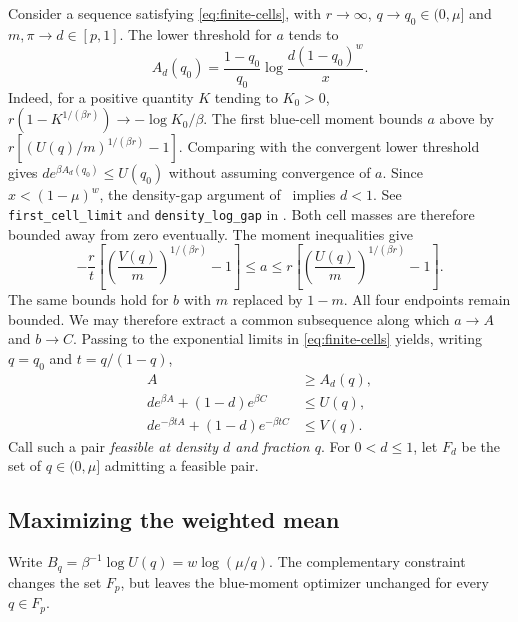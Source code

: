Consider a sequence satisfying \eqref{eq:finite-cells}, with
$r\to\infty$, $q\to q_0\in(0,\mu]$ and $m,\pi\to d\in[p,1]$.
The lower threshold for $a$ tends to
\[
 A_d(q_0)=\frac{1-q_0}{q_0}\log\frac{d(1-q_0)^w}{x}.
\]
Indeed, for a positive quantity $K$ tending to $K_0>0$,
$r(1-K^{1/(\beta r)})\to-\log K_0/\beta$.
The first blue-cell moment bounds $a$ above by
$r[(U(q)/m)^{1/(\beta r)}-1]$. Comparing with the convergent lower
threshold gives $d e^{\beta A_d(q_0)}\le U(q_0)$ without assuming
convergence of $a$. Since $x<(1-\mu)^w$, the density-gap argument
of~\cite[Proposition~3.5, Step~6]{ZBS} implies $d<1$.
See \texttt{first\_cell\_limit} and \texttt{density\_log\_gap} in
.
Both cell masses are therefore bounded away from zero eventually.
The moment inequalities give
\[
 -\frac r t\left[\left(\frac{V(q)}m\right)^{1/(\beta r)}-1\right]
 \le a\le
 r\left[\left(\frac{U(q)}m\right)^{1/(\beta r)}-1\right].
\]
The same bounds hold for $b$ with $m$ replaced by $1-m$.
All four endpoints remain bounded. We may therefore extract a common
subsequence along which $a\to A$ and $b\to C$.
Passing to the exponential limits in \eqref{eq:finite-cells} yields,
writing $q=q_0$ and $t=q/(1-q)$,
\begin{equation}\label{eq:feasible-pair}
 \begin{aligned}
 A&\ge A_d(q),\\
 d e^{\beta A}+(1-d)e^{\beta C}&\le U(q),\\
 d e^{-\beta tA}+(1-d)e^{-\beta tC}&\le V(q).
 \end{aligned}
\end{equation}
Call such a pair \emph{feasible at density $d$ and fraction $q$}.
For $0<d\le1$, let $F_d$ be the set of $q\in(0,\mu]$ admitting a
feasible pair.

\subsection{Maximizing the weighted mean}

Write $B_q=\beta^{-1}\log U(q)=w\log(\mu/q)$.
The complementary constraint changes the set $F_p$, but leaves the
blue-moment optimizer unchanged for every $q\in F_p$.


